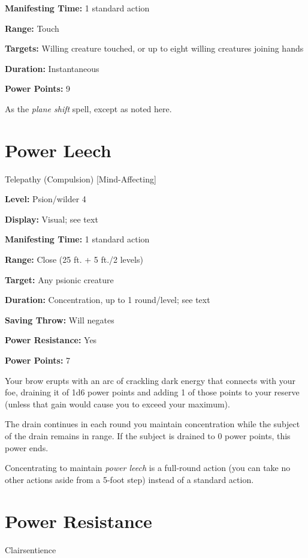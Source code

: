 \documentclass{article}
\begin{document}
\textbf{Manifesting Time:} 1 standard action

\textbf{Range:} Touch

\textbf{Targets:} Willing creature touched, or up to eight willing creatures joining 
hands

\textbf{Duration:} Instantaneous

\textbf{Power Points:} 9

As the \textit{plane shift }spell, except as noted here.

\vspace{12pt}
\section*{Power Leech}

Telepathy (Compulsion) [Mind-Affecting]

\textbf{Level:} Psion/wilder 4

\textbf{Display:} Visual; see text

\textbf{Manifesting Time:} 1 standard action

\textbf{Range:} Close (25 ft. + 5 ft./2 levels)

\textbf{Target:} Any psionic creature

\textbf{Duration:} Concentration, up to 1 round/level; see text

\textbf{Saving Throw:} Will negates

\textbf{Power Resistance:} Yes

\textbf{Power Points:} 7

Your brow erupts with an arc of crackling dark energy that connects with your foe, 
draining it of 1d6 power points and adding 1 of those points to your reserve (unless 
that gain would cause you to exceed your maximum). 

The drain continues in each round you maintain concentration while the subject 
of the drain remains in range. If the subject is drained to 0 power points, this 
power ends.

Concentrating to maintain \textit{power leech }is a full-round action (you can 
take no other actions aside from a 5-foot step) instead of a standard action.

\vspace{12pt}
\section*{Power Resistance}

Clairsentience
\end{document}
